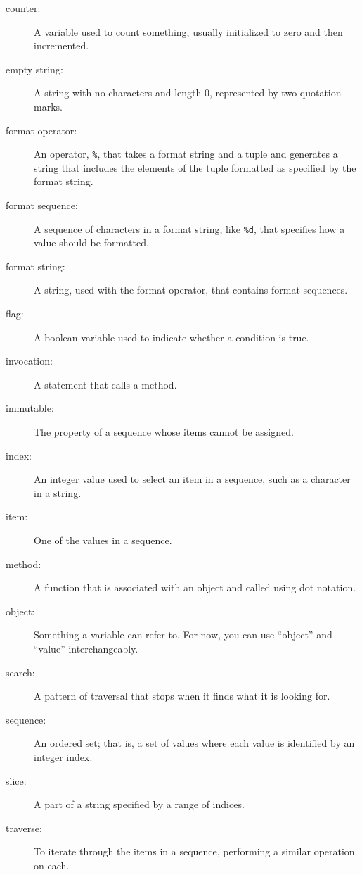 \begin{description}

\item[counter:] A variable used to count something, usually initialized
to zero and then incremented.

\item[empty string:] A string with no characters and length 0, represented
by two quotation marks.

\item[format operator:] An operator, {\tt \%}, that takes a format
string and a tuple and generates a string that includes
the elements of the tuple formatted as specified by the format string.

\item[format sequence:] A sequence of characters in a format string,
like {\tt \%d}, that specifies how a value should be formatted.

\item[format string:] A string, used with the format operator, that
contains format sequences.

\item[flag:] A boolean variable used to indicate whether a condition
is true.

\item[invocation:] A statement that calls a method.

\item[immutable:] The property of a sequence whose items cannot
be assigned.

\item[index:] An integer value used to select an item in
a sequence, such as a character in a string.

\item[item:] One of the values in a sequence.

\item[method:] A function that is associated with an object and called
using dot notation.

\item[object:] Something a variable can refer to.  For now,
you can use ``object'' and ``value'' interchangeably.

\item[search:] A pattern of traversal that stops
when it finds what it is looking for.

\item[sequence:] An ordered set; that is, a set of
values where each value is identified by an integer index.

\item[slice:] A part of a string specified by a range of indices.

\item[traverse:] To iterate through the items in a sequence,
performing a similar operation on each.

\end{description}



